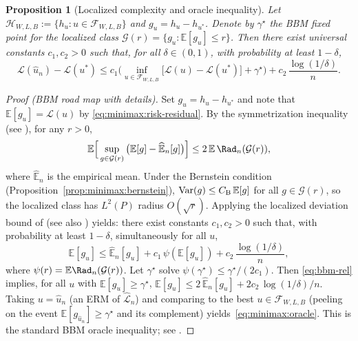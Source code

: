 \documentclass[pdflatex,sn-mathphys-ay]{sn-jnl}%
\numberwithin{equation}{section}
\theoremstyle{thmstyleone}%
\newtheorem{proposition}[theorem]{Proposition}%
\theoremstyle{thmstyletwo}%
\theoremstyle{thmstylethree}%
\begin{document}
\begin{proposition}[Localized complexity and oracle inequality]\label{prop:minimax:oracle}
Let \(\mathcal{H}_{W,L,B}:=\{h_u:u\in\mathcal{F}_{W,L,B}\}\) and \(g_u=h_u-h_{u^*}\).  Denote by \(\gamma^\star\) the BBM fixed point for the localized class \(\mathcal{G}(r)=\{g_u:\mathbb{E}[g_u]\le r\}\).  Then there exist universal constants \(c_1,c_2>0\) such that, for all \(\delta\in(0,1)\), with probability at least \(1-\delta\),
\begin{equation}\label{eq:minimax:oracle}
\mathcal{L}(\hat u_n)-\mathcal{L}(u^*) \le c_1\Big(\inf_{u\in\mathcal{F}_{W,L,B}}\big[\mathcal{L}(u)-\mathcal{L}(u^*)\big]+\gamma^\star\Big)+c_2\,\frac{\log(1/\delta)}{n}.
\end{equation}
\end{proposition}

\begin{proof}[Proof (BBM road map with details)]
Set \(g_u=h_u-h_{u^*}\) and note that \(\mathbb{E}[g_u]=\mathcal{L}(u)\) by \eqref{eq:minimax:risk-residual}.  By the symmetrization inequality (see \cite[Sec.\ 2]{bartlett2005local}), for any \(r>0\),
\begin{equation}\label{eq:sym}
\mathbb{E}\Big[\sup_{g\in\mathcal{G}(r)}\big(\mathbb{E}[g]-\widehat{\mathbb{E}}_n[g]\big)\Big]
\le 2\,\mathbb{E}\,\Rad_n(\mathcal{G}(r)),
\end{equation}
where \(\widehat{\mathbb{E}}_n\) is the empirical mean.  Under the Bernstein condition (Proposition~\ref{prop:minimax:bernstein}), \(\operatorname{Var}(g)\le C_{\rm B}\,\mathbb{E}[g]\) for all \(g\in\mathcal{G}(r)\), so the localized class has \(L^2(P)\) radius \(O(\sqrt{r})\).  Applying the localized deviation bound of \cite[Theorem.\ 3.3 \& 3.5]{bartlett2005local} (see also \cite[Sec.\ 3]{koltchinskii2006local}) yields: there exist constants \(c_1,c_2>0\) such that, with probability at least \(1-\delta\), simultaneously for all \(u\),
\begin{equation}\label{eq:bbm-rel}
\mathbb{E}[g_u]\le \widehat{\mathbb{E}}_n[g_u] + c_1\,\psi(\mathbb{E}[g_u]) + c_2\,\frac{\log(1/\delta)}{n},
\end{equation}
where \(\psi(r)=\mathbb{E}\Rad_n(\mathcal{G}(r))\).  Let \(\gamma^\star\) solve \(\psi(\gamma^\star)\le \gamma^\star/(2c_1)\).  Then \eqref{eq:bbm-rel} implies, for all \(u\) with \(\mathbb{E}[g_u]\ge \gamma^\star\),
\(
\mathbb{E}[g_u] \le 2\,\widehat{\mathbb{E}}_n[g_u] + 2c_2\,\log(1/\delta)/n.
\)
Taking \(u=\hat u_n\) (an ERM of \(\widehat{\mathcal{L}}_n\)) and comparing to the best \(u\in\mathcal{F}_{W,L,B}\) (peeling on the event \(\mathbb{E}[g_{\hat u_n}]\ge \gamma^\star\) and its complement) yields~\eqref{eq:minimax:oracle}.  This is the standard BBM oracle inequality; see \cite[Theorem.\ 3.5]{bartlett2005local}.
\end{proof}
\end{document}

